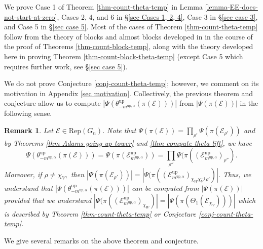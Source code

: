 \documentclass[11pt,letterpaper]{amsart}
\newcommand{\Rep}{{\mathrm{Rep}}}
\newcommand{\up}{{\mathrm{up}}}
\newcommand{\inv}{^{-1}}
\newcommand{\EE}{\mathcal{E}}
\newtheorem{rmk}[thm]{Remark}
\numberwithin{equation}{section}
\begin{document}
We prove Case 1 of Theorem \ref{thm-count-theta-temp} in Lemma \ref{lemma-EE-does-not-start-at-zero}, Cases 2, 4, and 6 in \S\ref{sec Cases 1, 2, 4}, Case 3 in \S\ref{sec case 3}, and Case 5 in \S\ref{sec case 5}. Most of the cases of Theorem \ref{thm-count-theta-temp} follow from the theory of blocks and almost blocks developed in \cite{HKT26} in the course of the proof of Theorems \ref{thm-count-block-temp}, along with the theory developed here in proving Theorem \ref{thm-count-block-theta-temp} (except Case 5 which requires further work, see \S\ref{sec case 5}).

We do not prove Conjecture \ref{conj-count-theta-temp}; however, we comment on its motivation in Appendix \ref{sec motivation}.
Collectively, the previous theorem and conjecture allow us to compute $|\Psi(\theta_{-m^{\up, \alpha}}^{\up}(\pi(\EE)))|$ from $|\Psi(\pi(\EE))|$ in the following sense.

\begin{rmk}\label{rmk theta count}
    Let $\EE\in\Rep(G_n).$
    Note that $\Psi(\pi(\EE))=\prod_{\rho'}\Psi(\pi(\EE_{\rho'}))$ and by Theorems \ref{thm Adams going up tower} and \ref{thm compute theta lift}, we have \[\Psi(\theta_{-m^{\up, \alpha}}^{\up}(\pi(\EE)))=\Psi(\pi(\EE_{m^{\up,\alpha}}^\up))=\prod_{\rho''}\Psi(\pi((\EE_{m^{\up,\alpha}}^\up)_{\rho''}).\] Moreover, if $\rho\neq\chi_V,$ then $|\Psi(\pi(\EE_{\rho'}))|=|\Psi(\pi((\EE_{m^{\up,\alpha}}^\up)_{\chi_W\chi_V\inv\rho'})|.$ Thus, we understand that $|\Psi(\theta_{-m^{\up, \alpha}}^{\up}(\pi(\EE)))|$ can be computed from $|\Psi(\pi(\EE))|$ provided that we understand $|\Psi(\pi((\EE_{m^{\up,\alpha}}^\up)_{\chi_W})|=|\Psi(\pi(\Theta_1(\EE_{\chi_V})))|$ which is described by Theorem \ref{thm-count-theta-temp} or Conjecture \ref{conj-count-theta-temp}.
\end{rmk}

We give several remarks on the above theorem and conjecture.
\end{document}
